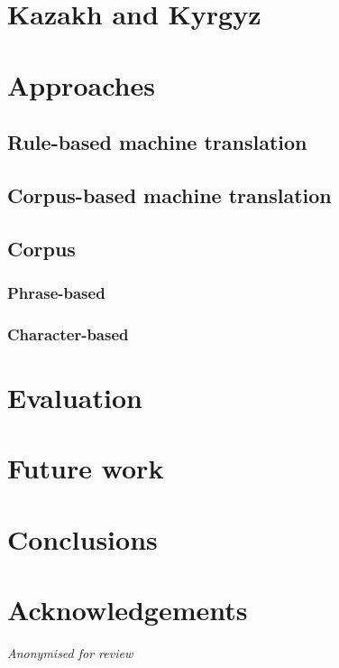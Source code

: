 \documentclass[11pt]{article}
\begin{document}
\section{Kazakh and Kyrgyz}

\section{Approaches}

\subsection{Rule-based machine translation}

\subsection{Corpus-based machine translation}

\subsection{Corpus}

\subsubsection{Phrase-based}

\subsubsection{Character-based }

\section{Evaluation}

\section{Future work}

\section{Conclusions}

\section*{Acknowledgements}

\emph{Anonymised for review}



\end{document}
